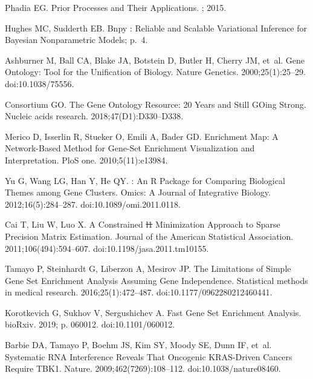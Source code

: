 \documentclass[10pt,letterpaper]{article}
\providecommand{\DIFaddtex}[1]{{\protect\color{blue}\uwave{#1}}} %
\providecommand{\DIFdeltex}[1]{{\protect\color{red}\sout{#1}}}                      %
\providecommand{\DIFaddbegin}{} %
\providecommand{\DIFaddend}{} %
\providecommand{\DIFdelbegin}{} %
\providecommand{\DIFdelend}{} %
\providecommand{\DIFadd}[1]{\texorpdfstring{\DIFaddtex{#1}}{#1}} %
\providecommand{\DIFdel}[1]{\texorpdfstring{\DIFdeltex{#1}}{}} %
\newcommand{\DIFscaledelfig}{0.5}
\newlength{\DIFdelgraphicswidth} %
\newlength{\DIFdelgraphicsheight} %
\newcommand{\DIFaddincludegraphics}[2][]{{\color{blue}\fbox{\DIFOincludegraphics[#1]{#2}}}} %
\newcommand{\DIFdelincludegraphics}[2][]{%
\sbox{\DIFdelgraphicsbox}{\DIFOincludegraphics[#1]{#2}}%
\settoboxwidth{\DIFdelgraphicswidth}{\DIFdelgraphicsbox} %
\settoboxtotalheight{\DIFdelgraphicsheight}{\DIFdelgraphicsbox} %
\scalebox{\DIFscaledelfig}{%
\parbox[b]{\DIFdelgraphicswidth}{\usebox{\DIFdelgraphicsbox}\\[-\baselineskip] \rule{\DIFdelgraphicswidth}{0em}}\llap{\resizebox{\DIFdelgraphicswidth}{\DIFdelgraphicsheight}{%
\setlength{\unitlength}{\DIFdelgraphicswidth}%
\begin{picture}(1,1)%
\thicklines\linethickness{2pt} %
{\color[rgb]{1,0,0}\put(0,0){\framebox(1,1){}}}%
{\color[rgb]{1,0,0}\put(0,0){\line( 1,1){1}}}%
{\color[rgb]{1,0,0}\put(0,1){\line(1,-1){1}}}%
\end{picture}%
}\hspace*{3pt}}} %
} %
\DeclareRobustCommand{\DIFaddbegin}{\DIFOaddbegin \let\includegraphics\DIFaddincludegraphics} %
\DeclareRobustCommand{\DIFaddend}{\DIFOaddend \let\includegraphics\DIFOincludegraphics} %
\DeclareRobustCommand{\DIFdelbegin}{\DIFOdelbegin \let\includegraphics\DIFdelincludegraphics} %
\DeclareRobustCommand{\DIFdelend}{\DIFOaddend \let\includegraphics\DIFOincludegraphics} %
\begin{document}
\begin{thebibliography}{10}
	Phadia EG.
	\newblock Prior Processes and Their Applications.
	; 2015.

	Hughes MC, Sudderth EB.
	\newblock Bnpy : {{Reliable}} and Scalable Variational Inference for
	{{Bayesian}} Nonparametric Models; p.~4.

	Ashburner M, Ball CA, Blake JA, Botstein D, Butler H, Cherry JM, et~al.
	\newblock Gene {{Ontology}}: Tool for the Unification of Biology.
	\newblock Nature Genetics. 2000;25(1):25--29.
	\newblock doi:{10.1038/75556}.

	Consortium GO.
	\newblock The Gene Ontology Resource: 20 Years and Still {{GOing}} Strong.
	\newblock Nucleic acids research. 2018;47(D1):D330--D338.

	Merico D, Isserlin R, Stueker O, Emili A, Bader GD.
	\newblock Enrichment Map: A Network-Based Method for Gene-Set Enrichment
	Visualization and Interpretation.
	\newblock PloS one. 2010;5(11):e13984.

	Yu G, Wang LG, Han Y, He QY.
	: An {{R}} Package for Comparing Biological Themes
	among Gene Clusters.
	\newblock Omics: A Journal of Integrative Biology. 2012;16(5):284--287.
	\newblock doi:{10.1089/omi.2011.0118}.

	Cai T, Liu W, Luo X.
	\newblock A {{Constrained}} \DIFdelbegin \DIFdel{l1 }\DIFdelend \DIFaddbegin {\DIFadd{$l$}}\DIFadd{1 }\DIFaddend {{Minimization Approach}} to
	{{Sparse Precision Matrix Estimation}}.
	\newblock Journal of the American Statistical Association.
	2011;106(494):594--607.
	\newblock doi:{10.1198/jasa.2011.tm10155}.

	Tamayo P, Steinhardt G, Liberzon A, Mesirov JP.
	\newblock The {{Limitations}} of {{Simple Gene Set Enrichment Analysis Assuming
			Gene Independence}}.
	\newblock Statistical methods in medical research. 2016;25(1):472--487.
	\newblock doi:{10.1177/0962280212460441}.

	Korotkevich G, Sukhov V, Sergushichev A.
	\newblock Fast Gene Set Enrichment Analysis.
	\newblock bioRxiv. 2019; p. 060012.
	\newblock doi:{10.1101/060012}.

	Barbie DA, Tamayo P, Boehm JS, Kim SY, Moody SE, Dunn IF, et~al.
	\newblock Systematic {{RNA}} Interference Reveals That Oncogenic
	{{KRAS}}-Driven Cancers Require {{TBK1}}.
	\newblock Nature. 2009;462(7269):108--112.
	\newblock doi:{10.1038/nature08460}.


\end{thebibliography}
\end{document}
